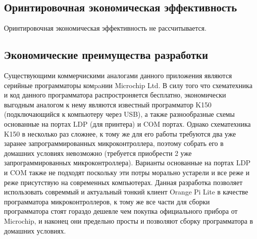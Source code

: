\subsection{Оринтировочная экономическая эффективность}
Оринтировочная экономическая эффективность не рассчитывается.

\subsection{Экономические преимущества разработки}
Существующими коммерчискими аналогами данного приложения являются серийные программаторы комpaнии Microchip Ltd. В силу того что схематехника и код данного программатора распростроняется бесплатно, экономически выгодным аналогом к нему являются известный программатор K150 (подключающийся к компьютеру через USB), а также разнообразные схемы основанные на портах LDP (для принтера) и COM портах. Однако схематехника K150 в несколько раз сложнее, к тому же для его работы требуются два уже заранее запрограммированных микроконтроллера, поэтому собрать его в домашних условиях невозможно (требуется приобрести 2 уже запрограммированных микроконтроллера). Варианты основанные на портах LDP и COM также не подходят поскольку эти потры морально устарели и все реже и реже присутствую на современных компьютерах. Данная разработка позволяет использовать совреммый и актуальный тонкий клиент Orange Pi Lite в качестве программатора микроконтроллеров, к тому же все части для сборки программатора стоят гораздо дешевле чем покупка официального прибора от Microchip, и наконец они предельно просты и позволяют сборку программатора в домашних условиях.